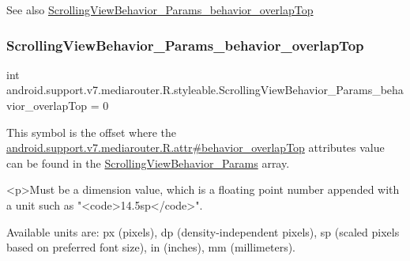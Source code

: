 \begin{DoxySeeAlso}{See also}
\hyperlink{classandroid_1_1support_1_1v7_1_1mediarouter_1_1R_1_1styleable_a6677a8ccfe953f468119c97a9f22aa0a}{Scrolling\+View\+Behavior\+\_\+\+Params\+\_\+behavior\+\_\+overlap\+Top} 
\end{DoxySeeAlso}
\mbox{\label{classandroid_1_1support_1_1v7_1_1mediarouter_1_1R_1_1styleable_a6677a8ccfe953f468119c97a9f22aa0a}} 
\subsubsection{\texorpdfstring{Scrolling\+View\+Behavior\+\_\+\+Params\+\_\+behavior\+\_\+overlap\+Top}{ScrollingViewBehavior\_Params\_behavior\_overlapTop}}
{\footnotesize\ttfamily int android.\+support.\+v7.\+mediarouter.\+R.\+styleable.\+Scrolling\+View\+Behavior\+\_\+\+Params\+\_\+behavior\+\_\+overlap\+Top = 0\hspace{0.3cm}{\ttfamily [static]}}

This symbol is the offset where the \hyperlink{classandroid_1_1support_1_1v7_1_1mediarouter_1_1R_1_1attr_a722a2f82701991e158ae91475412028c}{android.\+support.\+v7.\+mediarouter.\+R.\+attr\#behavior\+\_\+overlap\+Top} attribute\textquotesingle{}s value can be found in the \hyperlink{classandroid_1_1support_1_1v7_1_1mediarouter_1_1R_1_1styleable_a2b45e98021da441a2c6395c20bd5196c}{Scrolling\+View\+Behavior\+\_\+\+Params} array.

\begin{DoxyVerb}      <p>Must be a dimension value, which is a floating point number appended with a unit such as "<code>14.5sp</code>".
\end{DoxyVerb}
 Available units are\+: px (pixels), dp (density-\/independent pixels), sp (scaled pixels based on preferred font size), in (inches), mm (millimeters). 

